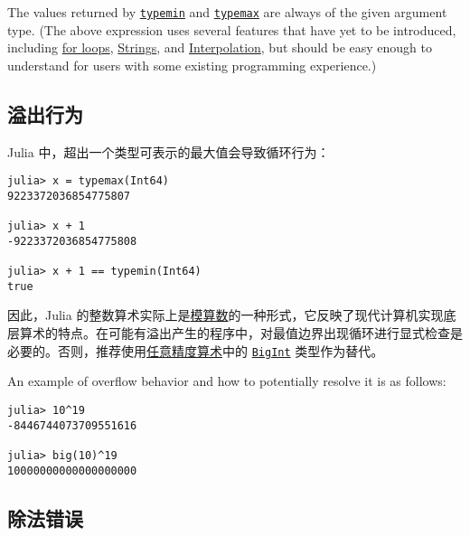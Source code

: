 The values returned by \hyperlink{3613894539247233488}{\texttt{typemin}} and \hyperlink{17760305803764597758}{\texttt{typemax}} are always of the given argument type. (The above expression uses several features that have yet to be introduced, including \hyperlink{9034109510149997190}{for loops}, \hyperlink{205866387929607333}{Strings}, and \hyperlink{4452850363638134205}{Interpolation}, but should be easy enough to understand for users with some existing programming experience.)



\hypertarget{7600249066838051055}{}


\subsection{溢出行为}



Julia 中，超出一个类型可表示的最大值会导致循环行为：




\begin{verbatim}
julia> x = typemax(Int64)
9223372036854775807

julia> x + 1
-9223372036854775808

julia> x + 1 == typemin(Int64)
true
\end{verbatim}



因此，Julia 的整数算术实际上是\href{https://zh.wikipedia.org/wiki/\%E6\%A8\%A1\%E7\%AE\%97\%E6\%95\%B8}{模算数}的一种形式，它反映了现代计算机实现底层算术的特点。在可能有溢出产生的程序中，对最值边界出现循环进行显式检查是必要的。否则，推荐使用\hyperlink{7537478913062818871}{任意精度算术}中的 \hyperlink{423405808990690832}{\texttt{BigInt}} 类型作为替代。



An example of overflow behavior and how to potentially resolve it is as follows:




\begin{verbatim}
julia> 10^19
-8446744073709551616

julia> big(10)^19
10000000000000000000
\end{verbatim}



\hypertarget{18099425100953658872}{}


\subsection{除法错误}



